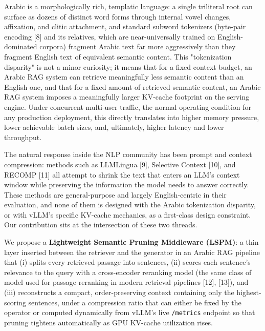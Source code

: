 Arabic is a morphologically rich, templatic language: a single triliteral root can surface as dozens of distinct word forms through internal vowel changes, affixation, and clitic attachment, and standard subword tokenizers (byte-pair encoding [8] and its relatives, which are near-universally trained on English-dominated corpora) fragment Arabic text far more aggressively than they fragment English text of equivalent semantic content. This "tokenization disparity" is not a minor curiosity; it means that for a fixed context budget, an Arabic RAG system can retrieve meaningfully less semantic content than an English one, and that for a fixed amount of retrieved semantic content, an Arabic RAG system imposes a meaningfully larger KV-cache footprint on the serving engine. Under concurrent multi-user traffic, the normal operating condition for any production deployment, this directly translates into higher memory pressure, lower achievable batch sizes, and, ultimately, higher latency and lower throughput.

The natural response inside the NLP community has been prompt and context compression: methods such as LLMLingua [9], Selective Context [10], and RECOMP [11] all attempt to shrink the text that enters an LLM's context window while preserving the information the model needs to answer correctly. These methods are general-purpose and largely English-centric in their evaluation, and none of them is designed with the Arabic tokenization disparity, or with vLLM's specific KV-cache mechanics, as a first-class design constraint. Our contribution sits at the intersection of these two threads.

We propose a \textbf{Lightweight Semantic Pruning Middleware (LSPM)}: a thin layer inserted between the retriever and the generator in an Arabic RAG pipeline that (i) splits every retrieved passage into sentences, (ii) scores each sentence's relevance to the query with a cross-encoder reranking model (the same class of model used for passage reranking in modern retrieval pipelines [12], [13]), and (iii) reconstructs a compact, order-preserving context containing only the highest-scoring sentences, under a compression ratio that can either be fixed by the operator or computed dynamically from vLLM's live \texttt{/metrics} endpoint so that pruning tightens automatically as GPU KV-cache utilization rises.

